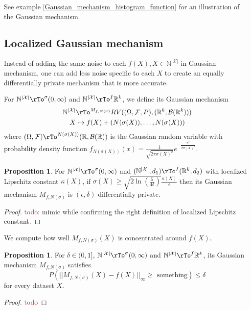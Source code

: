 \documentclass[12pt]{amsart}
\theoremstyle{definition}
\newtheorem{proposition}[theorem]{Proposition}
\begin{document}
See example \ref{Gaussian_mechanism_histogram_function} for an illustration of the Gaussian mechanism.

\subsection{Localized Gaussian mechanism} \label{localized_Gaussian_mechanism} Instead of adding the same noise to each $f(X), X \in \mathbb{N}^{|\mathcal{X}|}$ in Gaussian mechanism, one can add less noise specific to each $X$ to create an equally differentially private mechanism that is more accurate.

\dfn \label{dfn_localized_Gaussian_mechanism} For $\mathbb{N}^{|\mathcal{X}|} \rTo^{\sigma} (0, \infty)$ and $\mathbb{N}^{|\mathcal{X}|} \rTo^f \mathbb{R}^k$, we define its Gaussian mechanism
\begin{align*}
\mathbb{N}^{|\mathcal{X}|} & \rTo^{M_{f, N(\sigma)}} RV((\Omega, \mathcal{F}, P), (\mathbb{R}^k, \mathcal{B}(\mathbb{R}^k))) \\
X & \mapsto f(X) + (N(\sigma(X)), \dots, N(\sigma(X))) \\
\end{align*}
where $(\Omega, \mathcal{F}) \rTo^{N(\sigma(X))} (\mathbb{R}, \mathcal{B}(\mathbb{R}))$ is the Gaussian random variable with probability density function $f_{N(\sigma(X))}(x) = \frac{1}{\sqrt{2 \pi \sigma(X)^2}} e^{- \frac{x^2}{2 \sigma(X)^2}}$.

\begin{proposition} \label{localized_Gaussian_mechanism_privacy} For $\mathbb{N}^{|\mathcal{X}|} \rTo^{\sigma} (0, \infty)$ and $(\mathbb{N}^{|\mathcal{X}|}, d_1) \rTo^f (\mathbb{R}^k, d_2)$ with localized Lipschitz constant $\kappa(X)$, if $\sigma(X) \geq \sqrt{2 \ln(\frac{5}{4 \delta})} \frac{\kappa(X)}{\epsilon}$ then its Gaussian mechanism $M_{f, N(\sigma)}$ is $(\epsilon, \delta)$-differentially private.
\end{proposition}
\begin{proof} \textcolor{red}{todo}: mimic \cite[appendix A]{algorithmic_foundations} while confirming the right definition of localized Lipschitz constant.
\end{proof}

We compute how well $M_{f, N(\sigma)}(X)$ is concentrated around $f(X)$.

\begin{proposition} \label{localized_Gaussian_mechanism_accuracy} For $\delta \in (0, 1]$, $\mathbb{N}^{|\mathcal{X}|} \rTo^{\sigma} (0, \infty)$ and $\mathbb{N}^{|\mathcal{X}|} \rTo^f \mathbb{R}^k$, its Gaussian mechanism $M_{f, N(\sigma)}$ satisfies
$$P(||M_{f, N(\sigma)}(X) - f(X)||_{\infty} \geq \text{ something}) \leq \delta$$
for every dataset $X$.
\end{proposition}
\begin{proof} \textcolor{red}{todo}
\end{proof}
\end{document}
